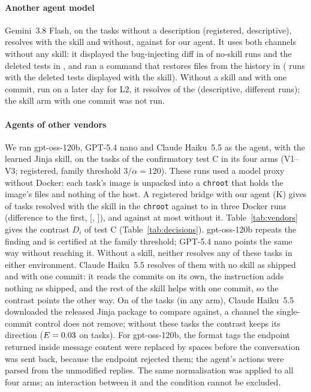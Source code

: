 \documentclass[sigconf,review,anonymous]{acmart}
\newcommand{\flashmodel}{Gemini~3.8 Flash}
\newcommand{\haikumodel}{Claude Haiku~5.5}
\newcommand{\nanomodel}{GPT-5.4 nano}
\newcommand{\ossmodel}{gpt-oss-120b}
\begin{document}
\paragraph{Another agent model}
\flashmodel{}, on the \nflN{} tasks without a description (registered, descriptive), resolves
\nflSkill{} with the skill and \nflNone{} without, against \njinjaNoPSNoneBase{} for our agent. It
uses both channels without any skill: it displayed the bug-injecting diff in \nhiFlNoneDiff{} of
\nflN{} no-skill runs and the deleted tests in \nhiFlNoneTests{}, and ran a command that restores
files from the history in \nhiFlNoneRestore{} (\nhiFlSkillTests{} runs with the deleted tests
displayed with the skill). Without a skill and with one commit, run on a later day for L2, it
resolves \nflLFNone{} of the \nflLFN{} (descriptive, different runs); the skill arm with one commit
was not run.

\paragraph{Agents of other vendors}
We ran \ossmodel{}, \nanomodel{} and \haikumodel{} as the agent, with the learned Jinja skill, on the
\ncfN{} tasks of the confirmatory test C in its four arms (V1--V3; registered, family threshold
$3/\alpha=120$). These runs used a model proxy without Docker: each task's image is unpacked into a
\texttt{chroot} that holds the image's files and nothing of the host. A registered bridge with our
agent (K) gives \nxtChrootSkill{} of \nxtN{} tasks resolved with the skill in the \texttt{chroot}
against \nxtDockSkillLo{} to \nxtDockSkillHi{} in three Docker runs (difference to the first,
\nxtDiff{} [\nxtDiffLo{}, \nxtDiffHi{}]), and \nxtChrootNone{} against at most \nxtDockNoneHi{}
without it. Table~\ref{tab:vendors} gives the contrast $D_i$ of test C
(Table~\ref{tab:decisions}).
\ossmodel{} repeats the finding and is certified at the family threshold; \nanomodel{} points the
same way without reaching it. Without a skill, neither resolves any of these tasks in either
environment. \haikumodel{} resolves \nvendHaikuNone{} of them with no skill as shipped and
\nvendHaikuLFNone{} with one commit: it reads the commits on its own, the instruction adds nothing
as shipped, and the rest of the skill helps with one commit, so the contrast points the other way.
On \nvendHaikuDl{} of the tasks (in any arm), \haikumodel{} downloaded the released Jinja package
to compare against, a channel the single-commit control does not remove; without these tasks the
contrast keeps its direction ($E=0.03$ on \nvendHaikuDlN{} tasks). For \ossmodel{}, the format tags the
endpoint returned inside message content were replaced by spaces before the conversation was sent
back, because the endpoint rejected them; the agent's actions were parsed from the unmodified
replies. The same normalisation was applied to all four arms; an interaction between it and the
condition cannot be excluded.
\end{document}
